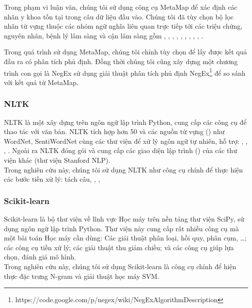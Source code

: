 Trong phạm vi luận văn, chúng tôi sử dụng công cụ MetaMap để xác định các nhãn y khoa tồn tại trong câu dữ liệu đầu vào. Chúng tôi đã tùy chọn bộ lọc nhãn từ vựng thuộc các nhóm ngữ nghĩa liên quan trực tiếp tới các triệu chứng, nguyên nhân, bệnh lý lâm sàng và cận lâm sàng gồm , , , , , , , , , .

Trong quá trình sử dụng MetaMap, chúng tôi chỉnh tùy chọn  để lấy được kết quả đầu ra có phân tích phủ định. Đồng thời chúng tôi cũng xây dựng một chương trình con gọi là NegEx sử dụng giải thuật phân tích phủ định NegEx\footnote{https://code.google.com/p/negex/wiki/NegExAlgorithmDescription} để so sánh với kết quả từ MetaMap.

\subsubsection*{NLTK}
NLTK \cite{bird2009natural} là một  xây dựng trên ngôn ngữ lập trình Python, cung cấp các công cụ để thao tác với văn bản. NLTK tích hợp hơn 50  và các nguồn từ vựng () như WordNet, SentiWordNet cùng các thư viện để xử lý ngôn ngữ tự nhiên, hỗ trợ: , , , . Ngoài ra NLTK đóng gói và cung cấp các giao diện lập trình () của các thư viện khác (thư viện Stanford NLP).\\

Trong nghiên cứu này, chúng tôi sử dụng NLTK như công cụ chính để thực hiện các bước tiền xử lý: tách câu, , , 
\subsubsection*{Scikit-learn}
Scikit-learn \cite{scikit-learn} là bộ thư viện về lĩnh vực Học máy trên nền tảng thư viện SciPy, sử dụng ngôn ngữ lập trình Python. Thư viện này cung cấp rất nhiều công cụ mà một bài toán Học máy cần dùng: Các giải thuật phân loại, hồi quy, phân cụm, \ldots; các công cụ tiền xử lý; các giải thuật thu giảm chiều; và các công cụ giúp lựa chọn, đánh giá mô hình.\\

Trong nghiên cứu này, chúng tôi sử dụng Scikit-learn là công cụ chính để hiện thực đặc trưng N-gram và giải thuật học máy SVM.

